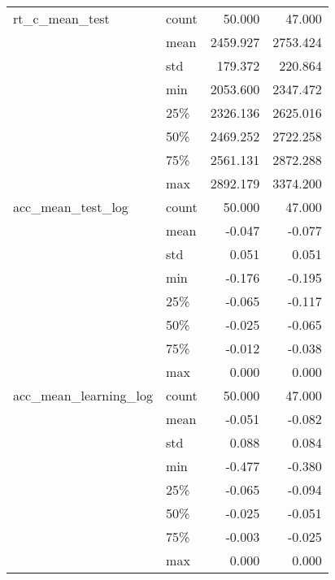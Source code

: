 \begin{tabular}{llrr}
rt\_c\_mean\_test & count &        50.000 &        47.000 \\
                      & mean &      2459.927 &      2753.424 \\
                      & std &       179.372 &       220.864 \\
                      & min &      2053.600 &      2347.472 \\
                      & 25\% &      2326.136 &      2625.016 \\
                      & 50\% &      2469.252 &      2722.258 \\
                      & 75\% &      2561.131 &      2872.288 \\
                      & max &      2892.179 &      3374.200 \\
acc\_mean\_test\_log & count &        50.000 &        47.000 \\
                      & mean &        -0.047 &        -0.077 \\
                      & std &         0.051 &         0.051 \\
                      & min &        -0.176 &        -0.195 \\
                      & 25\% &        -0.065 &        -0.117 \\
                      & 50\% &        -0.025 &        -0.065 \\
                      & 75\% &        -0.012 &        -0.038 \\
                      & max &         0.000 &         0.000 \\
acc\_mean\_learning\_log & count &        50.000 &        47.000 \\
                      & mean &        -0.051 &        -0.082 \\
                      & std &         0.088 &         0.084 \\
                      & min &        -0.477 &        -0.380 \\
                      & 25\% &        -0.065 &        -0.094 \\
                      & 50\% &        -0.025 &        -0.051 \\
                      & 75\% &        -0.003 &        -0.025 \\
                      & max &         0.000 &         0.000 \\
\bottomrule
\end{tabular}
